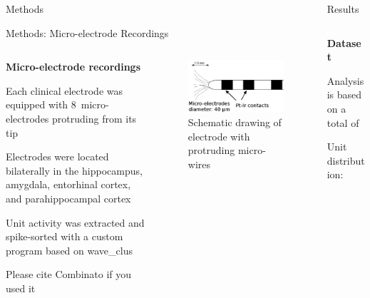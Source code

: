 \documentclass{beamer}
\renewcommand{\emph}{\textbf}
\newenvironment{wideitemize}{\itemize\addtolength{\itemsep}{.2em}\addtolength{\labelsep}{.1ex}}{\enditemize}
\begin{document}
\begin{frame}[t]
\begin{columns}[T]
\begin{column}{.32\linewidth}
\begin{block}{Methods}
\end{block}

\begin{block}{Methods: Micro-electrode Recordings}
\begin{columns}[T]
\begin{column}{.55\linewidth}
\emph{Micro-electrode recordings}
\begin{wideitemize}
\item Each clinical electrode was equipped with 8~micro-electrodes protruding from its tip
\item Electrodes were located bilaterally in the hippocampus, amygdala, entorhinal cortex, and parahippocampal cortex
\item Unit activity was extracted and spike-sorted with a custom program based on wave\_clus \parencite{quian_quiroga_unsupervised_2004}
\item Please cite Combinato if you used it
\end{wideitemize}
\end{column}
\begin{column}{.35\linewidth}
\begin{figure}
\label{fig:electrodes}
\includegraphics[width=.9\linewidth]{../figures/electrodes.png}
\caption{Schematic drawing of electrode with protruding micro-wires}
\end{figure}
\end{column}
\end{columns}
\end{block}



\end{column}
\begin{column}{.32\linewidth}

\begin{block}{Results}
\begin{columns}[T]
\begin{column}{.95\linewidth}
\emph{Dataset}
\begin{wideitemize}
\item Analysis is based on a total of 
\item Unit distribution: 
\end{wideitemize}


\end{column}
\end{columns}
\end{block}
\end{column}
\end{columns}
\end{frame}
\end{document}
